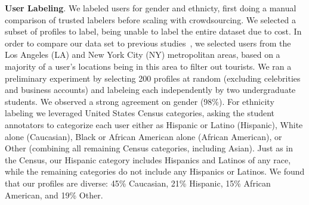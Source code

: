 \textbf{User Labeling}.
We labeled users for gender and ethnicty, first doing a manual comparison of trusted labelers before scaling with crowdsourcing.
We selected a subset of profiles to label, being unable to label the entire dataset due to cost.
In order to compare our data set to previous studies~\cite{Isaacman:2011un,Isaacman:2011cn,Isaacman:2010en}, we selected users from the Los Angeles (LA) and New York City (NY) metropolitan areas, based on a majority of a user's locations being in this area to filter out tourists.
We ran a preliminary experiment by selecting 200 profiles at random (excluding celebrities and business accounts) and labeleing each independently by two undergraduate students.
We observed a strong agreement on gender (98\%).
For ethnicity labeling we leveraged United States Census categories, asking the student annotators to categorize each user either as Hispanic or Latino (Hispanic), White alone (Caucasian), Black or African American alone (African American), or Other (combining all remaining Census categories, including Asian).
Just as in the Census, our Hispanic category includes Hispanics and Latinos of any race, while the remaining categories do not include any Hispanics or Latinos. 
We found that our profiles are diverse: 45\% Caucasian, 21\% Hispanic, 15\% African American, and 19\% Other.
